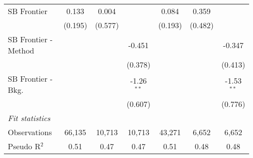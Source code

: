 \begin{tabular}{lcccccc}
   SB Frontier          & 0.133        & 0.004       &               & 0.084   & 0.359   &   \\   
                        & (0.195)      & (0.577)     &               & (0.193) & (0.482) &   \\   
   SB Frontier - Method &              &             & -0.451        &         &         & -0.347\\   
                        &              &             & (0.378)       &         &         & (0.413)\\   
   SB Frontier - Bkg.   &              &             & -1.26$^{**}$  &         &         & -1.53$^{**}$\\   
                        &              &             & (0.607)       &         &         & (0.776)\\   
   \midrule
   \emph{Fit statistics}\\
   Observations         & 66,135       & 10,713      & 10,713        & 43,271  & 6,652   & 6,652\\  
   Pseudo R$^2$         & 0.51         & 0.47        & 0.47          & 0.51    & 0.48    & 0.48\\  
   

\end{tabular}
